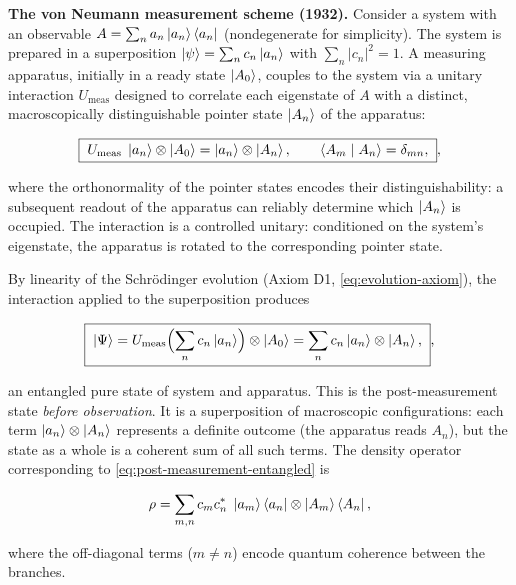 \medskip\noindent\textbf{The von Neumann measurement scheme (1932).}
Consider a system with an observable $A = \sum_n a_n \ket{a_n}\bra{a_n}$ (nondegenerate for simplicity). The system is prepared in a superposition $\ket{\psi} = \sum_n c_n \ket{a_n}$ with $\sum_n \lvert c_n\rvert^2 = 1$. A measuring apparatus, initially in a ready state $\ket{A_0}$, couples to the system via a unitary interaction $U_{\text{meas}}$ designed to correlate each eigenstate of $A$ with a distinct, macroscopically distinguishable pointer state $\ket{A_n}$ of the apparatus:
\begin{linenomath}
\begin{equation}
\boxed{\;
U_{\text{meas}}\;\ket{a_n} \otimes \ket{A_0}
= \ket{a_n} \otimes \ket{A_n},
\qquad
\braket{A_m \mid A_n} = \delta_{mn},
\;},
\label{eq:von-neumann-scheme}
\end{equation}
\end{linenomath}
where the orthonormality of the pointer states encodes their distinguishability: a subsequent readout of the apparatus can reliably determine which $\ket{A_n}$ is occupied. The interaction is a controlled unitary: conditioned on the system's eigenstate, the apparatus is rotated to the corresponding pointer state.

By linearity of the Schr\"odinger evolution (Axiom D1, \eqref{eq:evolution-axiom}), the interaction applied to the superposition produces
\begin{linenomath}
\begin{equation}
\boxed{\;
\ket{\Psi} = U_{\text{meas}}\Bigl(\sum_n c_n \ket{a_n}\Bigr) \otimes \ket{A_0}
= \sum_n c_n \ket{a_n} \otimes \ket{A_n},
\;},
\label{eq:post-measurement-entangled}
\end{equation}
\end{linenomath}
an entangled pure state of system and apparatus. This is the post-measurement state \textit{before observation}. It is a superposition of macroscopic configurations: each term $\ket{a_n} \otimes \ket{A_n}$ represents a definite outcome (the apparatus reads $A_n$), but the state as a whole is a coherent sum of all such terms. The density operator corresponding to \eqref{eq:post-measurement-entangled} is
\begin{linenomath}
\begin{equation}
\rho = \sum_{m,n} c_m c_n^{*}\; \ket{a_m}\bra{a_n} \otimes \ket{A_m}\bra{A_n},
\label{eq:post-measurement-density}
\end{equation}
\end{linenomath}
where the off-diagonal terms ($m \neq n$) encode quantum coherence between the branches.

